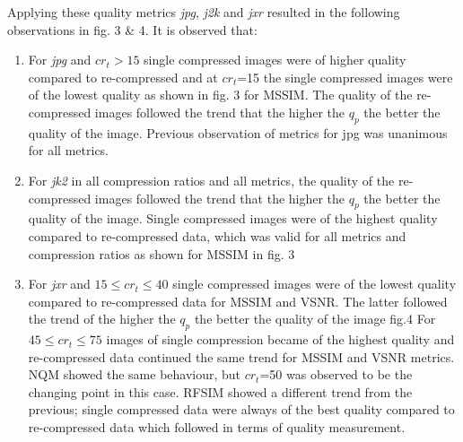\documentclass[10pt,twocolumn,letterpaper]{article}
\begin{document}
Applying these quality metrics \emph{jpg}, \emph{j2k} and \emph{jxr} resulted in the following observations in fig. 3 \& 4. It is observed that:
\begin{enumerate}
	\item For \emph{jpg} and $cr_t>15 $ single compressed images were of higher quality compared to re-compressed and
		 at $cr_t$=15 the single compressed images were of the lowest quality as shown in fig. 3 for MSSIM.
		 The quality of the re-compressed images followed the trend that the higher the $q_p$ the better the quality of the image. Previous observation of metrics for jpg was unanimous for all metrics.
	
	\item For \emph{jk2} in all compression ratios and all metrics, the quality of the re-compressed images followed the trend that the higher the $q_p$ the better the quality of the image. Single compressed images were of the highest quality compared to re-compressed data, which was valid for all metrics and compression ratios as shown for MSSIM in fig. 3 	 
			  
	
		\item For \emph{jxr} and $15\leq{cr_t}\leq{40}$ single compressed images were of the lowest quality compared to re-compressed data for MSSIM and VSNR. The latter followed the trend of the higher the $q_p$ the better the quality of the image fig.4		 
        For $45\leq{cr_t}\leq{75}$ images of single compression became of the highest quality and  re-compressed data continued the same trend for MSSIM and VSNR metrics.
        NQM showed the same behaviour, but ${cr_t}$=50 was observed to be the changing point in this case. RFSIM showed a different trend from the previous; single compressed data were always of the best quality compared to re-compressed data which followed in terms of quality measurement. 
   
   
   
\end{enumerate}
\end{document}
